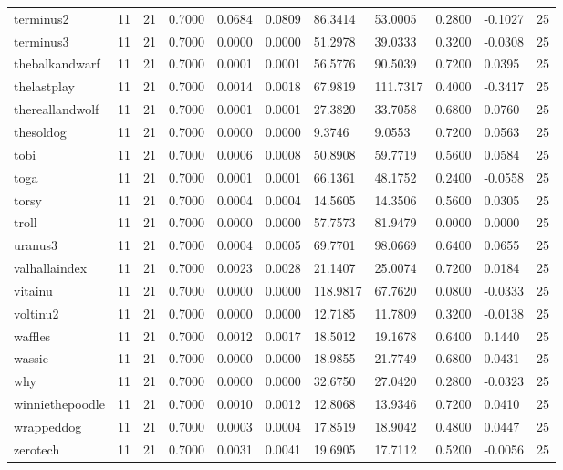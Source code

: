 \begin{table}[htbp]
\begin{tabular}{lllllllllll}
terminus2 & 11 & 21 & 0.7000 & 0.0684 & 0.0809 & 86.3414 & 53.0005 & 0.2800 & -0.1027 & 25 \\
terminus3 & 11 & 21 & 0.7000 & 0.0000 & 0.0000 & 51.2978 & 39.0333 & 0.3200 & -0.0308 & 25 \\
thebalkandwarf & 11 & 21 & 0.7000 & 0.0001 & 0.0001 & 56.5776 & 90.5039 & 0.7200 & 0.0395 & 25 \\
thelastplay & 11 & 21 & 0.7000 & 0.0014 & 0.0018 & 67.9819 & 111.7317 & 0.4000 & -0.3417 & 25 \\
thereallandwolf & 11 & 21 & 0.7000 & 0.0001 & 0.0001 & 27.3820 & 33.7058 & 0.6800 & 0.0760 & 25 \\
thesoldog & 11 & 21 & 0.7000 & 0.0000 & 0.0000 & 9.3746 & 9.0553 & 0.7200 & 0.0563 & 25 \\
tobi & 11 & 21 & 0.7000 & 0.0006 & 0.0008 & 50.8908 & 59.7719 & 0.5600 & 0.0584 & 25 \\
toga & 11 & 21 & 0.7000 & 0.0001 & 0.0001 & 66.1361 & 48.1752 & 0.2400 & -0.0558 & 25 \\
torsy & 11 & 21 & 0.7000 & 0.0004 & 0.0004 & 14.5605 & 14.3506 & 0.5600 & 0.0305 & 25 \\
troll & 11 & 21 & 0.7000 & 0.0000 & 0.0000 & 57.7573 & 81.9479 & 0.0000 & 0.0000 & 25 \\
uranus3 & 11 & 21 & 0.7000 & 0.0004 & 0.0005 & 69.7701 & 98.0669 & 0.6400 & 0.0655 & 25 \\
valhallaindex & 11 & 21 & 0.7000 & 0.0023 & 0.0028 & 21.1407 & 25.0074 & 0.7200 & 0.0184 & 25 \\
vitainu & 11 & 21 & 0.7000 & 0.0000 & 0.0000 & 118.9817 & 67.7620 & 0.0800 & -0.0333 & 25 \\
voltinu2 & 11 & 21 & 0.7000 & 0.0000 & 0.0000 & 12.7185 & 11.7809 & 0.3200 & -0.0138 & 25 \\
waffles & 11 & 21 & 0.7000 & 0.0012 & 0.0017 & 18.5012 & 19.1678 & 0.6400 & 0.1440 & 25 \\
wassie & 11 & 21 & 0.7000 & 0.0000 & 0.0000 & 18.9855 & 21.7749 & 0.6800 & 0.0431 & 25 \\
why & 11 & 21 & 0.7000 & 0.0000 & 0.0000 & 32.6750 & 27.0420 & 0.2800 & -0.0323 & 25 \\
winniethepoodle & 11 & 21 & 0.7000 & 0.0010 & 0.0012 & 12.8068 & 13.9346 & 0.7200 & 0.0410 & 25 \\
wrappeddog & 11 & 21 & 0.7000 & 0.0003 & 0.0004 & 17.8519 & 18.9042 & 0.4800 & 0.0447 & 25 \\
zerotech & 11 & 21 & 0.7000 & 0.0031 & 0.0041 & 19.6905 & 17.7112 & 0.5200 & -0.0056 & 25 \\

\end{tabular}
\end{table}
